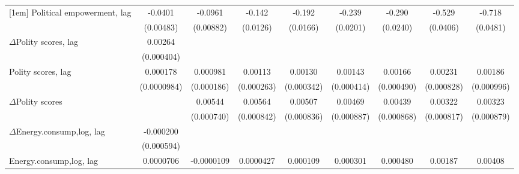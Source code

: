 \begin{table}[htbp]
\begin{tabular}{l*{8}{c}}
[1em]
Political empowerment, lag  &     -0.0401\sym{***}&     -0.0961\sym{***}&      -0.142\sym{***}&      -0.192\sym{***}&      -0.239\sym{***}&      -0.290\sym{***}&      -0.529\sym{***}&      -0.718\sym{***}\\
                    &   (0.00483)         &   (0.00882)         &    (0.0126)         &    (0.0166)         &    (0.0201)         &    (0.0240)         &    (0.0406)         &    (0.0481)         \\
[1em]
$\Delta$Polity scores, lag          &     0.00264\sym{***}&                     &                     &                     &                     &                     &                     &                     \\
                    &  (0.000404)         &                     &                     &                     &                     &                     &                     &                     \\
[1em]
Polity scores, lag            &    0.000178\sym{*}  &    0.000981\sym{***}&     0.00113\sym{***}&     0.00130\sym{***}&     0.00143\sym{***}&     0.00166\sym{***}&     0.00231\sym{***}&     0.00186\sym{*}  \\
                    & (0.0000984)         &  (0.000186)         &  (0.000263)         &  (0.000342)         &  (0.000414)         &  (0.000490)         &  (0.000828)         &  (0.000996)         \\
[1em]
$\Delta$Polity scores            &                     &     0.00544\sym{***}&     0.00564\sym{***}&     0.00507\sym{***}&     0.00469\sym{***}&     0.00439\sym{***}&     0.00322\sym{***}&     0.00323\sym{***}\\
                    &                     &  (0.000740)         &  (0.000842)         &  (0.000836)         &  (0.000887)         &  (0.000868)         &  (0.000817)         &  (0.000879)         \\
[1em]
$\Delta$Energy.consump,log, lag             &   -0.000200         &                     &                     &                     &                     &                     &                     &                     \\
                    &  (0.000594)         &                     &                     &                     &                     &                     &                     &                     \\
[1em]
Energy.consump,log, lag             &   0.0000706         &  -0.0000109         &   0.0000427         &    0.000109         &    0.000301         &    0.000480         &     0.00187         &     0.00408         \\

\end{tabular}
\end{table}
